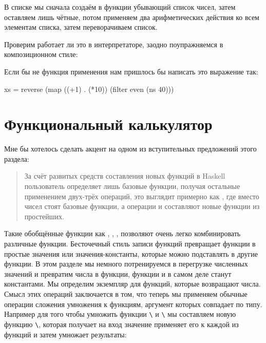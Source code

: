 В списке  мы сначала создаём в функции  
убывающий список чисел, затем оставляем лишь чётные, 
потом применяем два арифметических действия ко всем элементам
списка, затем переворачиваем список.

Проверим работает ли это в интерпретаторе, заодно поупражняемся
в композиционном стиле:


Если бы не функция применения нам пришлось бы написать 
это выражение так:

\begin{code}
xs = reverse (map ((+1) . (*10)) (filter even (ns 40)))
\end{code}


\section{Функциональный калькулятор}

Мне бы хотелось сделать акцент на одном из вступительных 
предложений этого раздела:

\begin{quote}
За счёт развитых средств составления новых функций в Haskell пользователь 
определяет лишь базовые функции, получая остальные 
применением двух-трёх операций, это выглядит примерно как ,
где вместо чисел стоят базовые функции, а операции \In{+} и \In{*} составляют
новые функции из простейших.
\end{quote}

Такие обобщённые функции как , , , 
 позволяют очень легко комбинировать различные функции.
Бесточечный стиль записи функций превращает функции
в простые значения или значения-константы, которые можно 
подставлять в другие функции. 
В этом разделе мы немного потренируемся в перегрузке численных значений и
превратим числа в функции, функции и в самом деле станут 
константами. Мы определим экземпляр  для функций,
которые возвращают числа. Смысл этих операций заключается
в том, что теперь мы применяем обычные операции сложения умножения
к функциям, аргумент которых совпадает по типу. Например для того 
чтобы умножить функции \verb!\! и
\verb!\! мы составляем новую функцию
\verb!\!, которая получает на
вход значение  применяет его к каждой из функций 
и затем умножает результаты:

